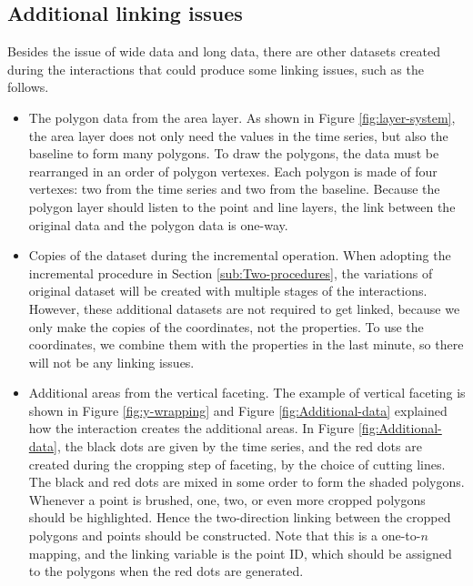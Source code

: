 \documentclass[12pt]{article}
\begin{document}
\subsection{Additional linking issues\label{sub:Linking-of-the-addition}}

Besides the issue of wide data and long data, there are other datasets
created during the interactions that could produce some linking issues,
such as the follows.
\begin{itemize} \itemsep 0in
\item The polygon data from the area layer. 
As shown in Figure \ref{fig:layer-system}, the area layer does not
only need the values in the time series, but also the baseline to
form many polygons. To draw the polygons, the data must be rearranged
in an order of polygon vertexes. Each polygon is made of four vertexes:
two from the time series and two from the baseline. Because the polygon
layer should listen to the point and line layers, the link between
the original data and the polygon data is one-way.

\item Copies of the dataset during the incremental operation.
When adopting the incremental procedure in Section 
\ref{sub:Two-procedures}, the variations of original dataset will
be created with multiple stages of the interactions. However, these
additional datasets are not required to get linked, because we only
make the copies of the coordinates, not the properties. To use the
coordinates, we combine them with the properties in the last minute,
so there will not be any linking issues.

\item Additional areas from the vertical faceting.
The example of vertical faceting is shown in Figure \ref{fig:y-wrapping}
and Figure \ref{fig:Additional-data} explained how the interaction
creates the additional areas. In Figure \ref{fig:Additional-data},
the black dots are given by the time series, and the red dots are
created during the cropping step of faceting, by the choice of
cutting lines. The black and red dots are mixed in some order to
form the shaded polygons. Whenever a point is brushed, one, two,
or even more cropped polygons should be highlighted. Hence the
two-direction linking between the cropped polygons and points
should be constructed. Note that this is a one-to-$n$ mapping,
and the linking variable is the point ID, which should be assigned
to the polygons when the red dots are generated.


\end{itemize}
\end{document}

